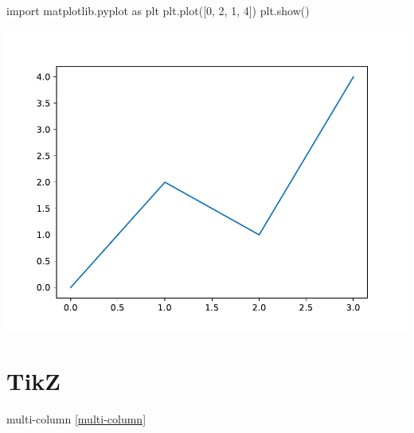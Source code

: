 \documentclass[
]{book}
\newenvironment{Shaded}{\begin{snugshade}}{\end{snugshade}}
\newcommand{\CommentTok}[1]{\textcolor[rgb]{0.56,0.35,0.01}{\textit{#1}}}
\newcommand{\DecValTok}[1]{\textcolor[rgb]{0.00,0.00,0.81}{#1}}
\newcommand{\ImportTok}[1]{#1}
\newcommand{\NormalTok}[1]{#1}
\theoremstyle{definition}
\theoremstyle{definition}
\theoremstyle{definition}
\theoremstyle{definition}
\theoremstyle{remark}
\begin{document}
\begin{Shaded}
\end{Shaded}

\begin{Shaded}
\begin{Highlighting}[]
\ImportTok{import}\NormalTok{ matplotlib.pyplot }\ImportTok{as}\NormalTok{ plt}
\NormalTok{plt.plot([}\DecValTok{0}\NormalTok{, }\DecValTok{2}\NormalTok{, }\DecValTok{1}\NormalTok{, }\DecValTok{4}\NormalTok{])}
\NormalTok{plt.show()}
\end{Highlighting}
\end{Shaded}

\includegraphics{202401292317-Python_files/figure-latex/unnamed-chunk-8-1.pdf}

\hypertarget{tikz}{%
\chapter{TikZ}\label{tikz}}

multi-column \ref{multi-column}
\end{document}
